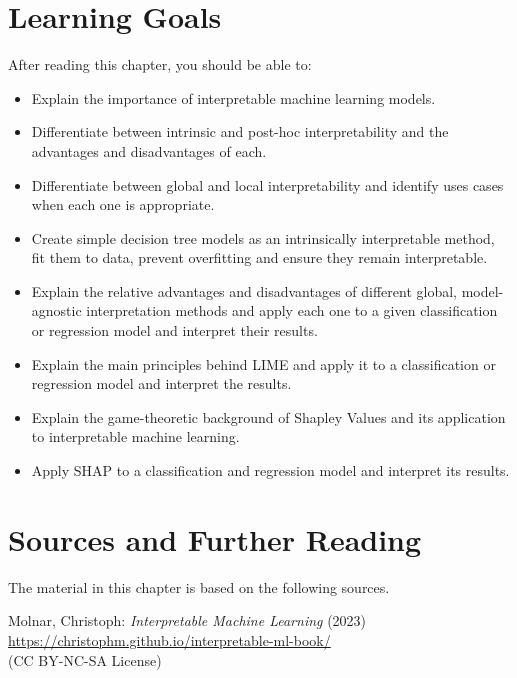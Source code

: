 %
%
\section*{Learning Goals}

After reading this chapter, you should be able to:
\begin{itemize}
    \item Explain the importance of interpretable machine learning models.
    \item Differentiate between intrinsic and post-hoc interpretability and the advantages and disadvantages of each.
    \item Differentiate between global and local interpretability and identify uses cases when each one is appropriate.
    \item Create simple decision tree models as an intrinsically interpretable method, fit them to data, prevent overfitting and ensure they remain interpretable.
    \item Explain the relative advantages and disadvantages of different global, model-agnostic interpretation methods and apply each one to a given classification or regression model and interpret their results. 
    \item Explain the main principles behind LIME and apply it to a 	classification or regression model and interpret the results. 
    \item Explain the game-theoretic background of Shapley Values and its application to interpretable machine learning. 
    \item Apply SHAP to a classification and regression model and interpret its results. 
\end{itemize}

\section*{Sources and Further Reading}

The material in this chapter is based on the following sources.

\begin{tcolorbox}[colback=alert]
Molnar, Christoph: \emph{Interpretable Machine Learning} (2023) \\

\url{https://christophm.github.io/interpretable-ml-book/} \\

(CC BY-NC-SA License)
\end{tcolorbox}

